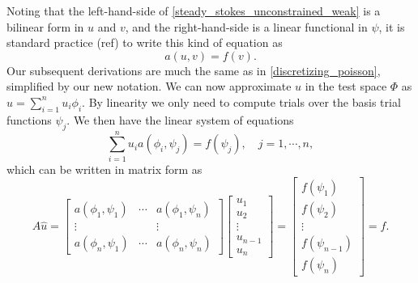 Noting that the left-hand-side of \eqref{steady_stokes_unconstrained_weak} is a bilinear form in $u$ and $v$, and the right-hand-side
is a linear functional in $\psi$, it is standard practice (ref) to write this kind of equation as
\begin{equation}
    a(u, v) = f(v).
\end{equation}
Our subsequent derivations are much the same as in \ref{discretizing_poisson}, simplified by our new notation.
We can now approximate $u$ in the test space $\Phi$ as $\hat{u} = \sum_{i=1}^nu_i\phi_i$. By linearity we only need to compute
trials over the basis trial functions $\psi_j$.
We then have the linear system of equations
\begin{equation}\label{elliptic_bilinear_form}
    \sum_{i=1}^n u_i a\left(\phi_i, \psi_j\right) = f(\psi_j),\quad j=1,\cdots,n,
\end{equation}
which can be written in matrix form as
\begin{equation}\label{elliptic_bilinear_form_matrix}
    A\hat{u} = \begin{bmatrix}
            a(\phi_1, \psi_1) & \cdots & a(\phi_1, \psi_n) \\
            \vdots & & \vdots \\
            a(\phi_n, \psi_1) & \cdots & a(\phi_n, \psi_n)
            \end{bmatrix}
    \begin{bmatrix} u_1 \\ u_2 \\ \vdots \\ u_{n-1} \\ u_n \end{bmatrix}
    =
    \begin{bmatrix} f(\psi_1) \\ f(\psi_2) \\ \vdots \\ f(\psi_{n-1}) \\ f(\psi_{n}) \end{bmatrix}
    = \hat{f}.
\end{equation}
